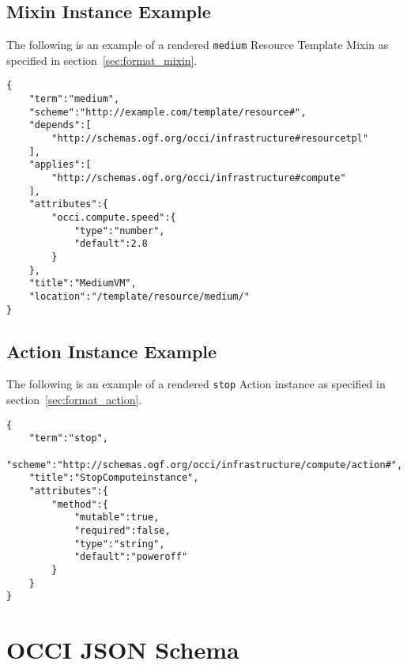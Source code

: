 \documentclass[10pt,a4paper]{article}
\begin{document}
\begin{appendices}
\subsection{Mixin Instance Example}
\label{mixin_instance_rendering_example}

The following is an example of a rendered \texttt{medium} Resource Template Mixin as specified in section~\ref{sec:format_mixin}.

\begin{lstlisting}
{
    "term":"medium",
    "scheme":"http://example.com/template/resource#",
    "depends":[
        "http://schemas.ogf.org/occi/infrastructure#resourcetpl"
    ],
    "applies":[
        "http://schemas.ogf.org/occi/infrastructure#compute"
    ],
    "attributes":{
        "occi.compute.speed":{
            "type":"number",
            "default":2.8
        }
    },
    "title":"MediumVM",
    "location":"/template/resource/medium/"
}
\end{lstlisting}


\subsection{Action Instance Example}
\label{action_instance_rendering_example}

The following is an example of a rendered \texttt{stop} Action instance as specified in section~\ref{sec:format_action}.

\begin{lstlisting}
{
    "term":"stop",
    "scheme":"http://schemas.ogf.org/occi/infrastructure/compute/action#",
    "title":"StopComputeinstance",
    "attributes":{
        "method":{
            "mutable":true,
            "required":false,
            "type":"string",
            "default":"poweroff"
        }
    }
}
\end{lstlisting}




\section{OCCI JSON Schema}



\end{appendices}
\end{document}
